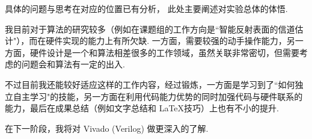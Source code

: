 \documentclass[fontset=windows,11pt]{SEU-Digital-Report}
\begin{document}
        具体的问题与思考在对应的位置已有分析，
        此处主要阐述对实验总体的体悟.

        我目前对于算法的研究较多（例如在课题组的工作方向是``智能反射表面的信道估计"），而在硬件实现的能力上有所欠缺.
        一方面，需要较强的动手操作能力，另一方面，硬件设计是一个和算法相差很多的工作领域，虽然关联非常密切，但需要考虑的问题会和算法有一定的出入.

        不过目前我还能较好适应这样的工作内容，经过锻炼，一方面是学习到了``如何独立自主学习"的技能，另一方面在利用代码能力优势的同时加强代码与硬件联系的能力，最后在成果总结（例如文字总结和 \LaTeX 技巧）上也有不小的提升.

        在下一阶段，我将对 Vivado (Verilog) 做更深入的了解.

    \printbibliography
\end{document}
